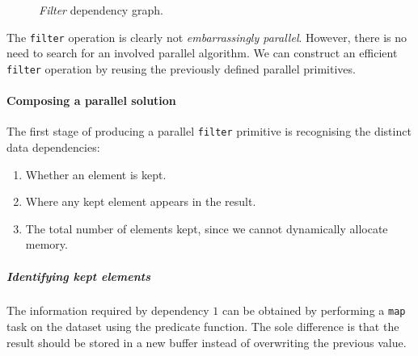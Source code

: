 \begin{figure}[h]
  \caption{\emph{Filter} dependency graph.}
  \label{fig:filtergraph}
  \begin{center}
  \end{center}
\end{figure}

The \verb|filter| operation is clearly not \emph{embarrassingly parallel}. However, there is no need to search for an involved parallel algorithm. We can construct an efficient \verb|filter| operation by reusing the previously defined parallel primitives.

\paragraph*{Composing a parallel solution}
The first stage of producing a parallel \verb|filter| primitive is recognising the distinct data dependencies:
\begin{enumerate}
  \item Whether an element is kept.
  \item Where any kept element appears in the result.
  \item The total number of elements kept, since we cannot dynamically allocate memory.
\end{enumerate}

\subparagraph*{Identifying kept elements}
The information required by dependency $1$ can be obtained by performing a \verb|map| task on the dataset using the predicate function. The sole difference is that the result should be stored in a new buffer instead of overwriting the previous value.

